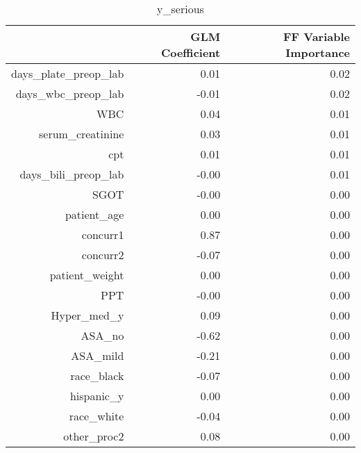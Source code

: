 \begin{table}[ht]
\centering
\begin{tabular}{rrr}
  \hline
 & GLM Coefficient & FF Variable Importance \\ 
  \hline
days\_plate\_preop\_lab & 0.01 & 0.02 \\ 
  days\_wbc\_preop\_lab & -0.01 & 0.02 \\ 
  WBC & 0.04 & 0.01 \\ 
  serum\_creatinine & 0.03 & 0.01 \\ 
  cpt & 0.01 & 0.01 \\ 
  days\_bili\_preop\_lab & -0.00 & 0.01 \\ 
  SGOT & -0.00 & 0.00 \\ 
  patient\_age & 0.00 & 0.00 \\ 
  concurr1 & 0.87 & 0.00 \\ 
  concurr2 & -0.07 & 0.00 \\ 
  patient\_weight & 0.00 & 0.00 \\ 
  PPT & -0.00 & 0.00 \\ 
  Hyper\_med\_y & 0.09 & 0.00 \\ 
  ASA\_no & -0.62 & 0.00 \\ 
  ASA\_mild & -0.21 & 0.00 \\ 
  race\_black & -0.07 & 0.00 \\ 
  hispanic\_y & 0.00 & 0.00 \\ 
  race\_white & -0.04 & 0.00 \\ 
  other\_proc2 & 0.08 & 0.00 \\ 
   \hline
\end{tabular}
\caption{y_serious} 
\end{table}

